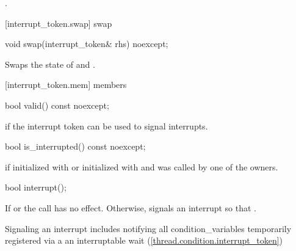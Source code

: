 {\begin{itemdescr}
  \pnum\returns {}.
\end{itemdescr}

[interrupt_token.swap]{ swap}

%
\begin{itemdecl}
void swap(interrupt_token& rhs) noexcept;
\end{itemdecl}

\begin{itemdescr}
\pnum
\effects Swaps the state of  and .
\end{itemdescr}


[interrupt_token.mem]{ members}

%
\begin{itemdecl}
bool valid() const noexcept;
\end{itemdecl}
\begin{itemdescr}
  \pnum\returns {} if the interrupt token can be used to signal interrupts.
\end{itemdescr}

%
\begin{itemdecl}
bool is_interrupted() const noexcept;
\end{itemdecl}
\begin{itemdescr}
  \pnum\returns {} if initialized with 
                or initialized with  and  was called
                by one of the owners.
\end{itemdescr}

%
\begin{itemdecl}
bool interrupt();
\end{itemdecl}
\begin{itemdescr}

  \pnum\effects If  or  the call has no effect. 
                Otherwise, signals an interrupt so that .
                \begin{note} Signaling an interrupt includes notifying all condition_variables
                             temporarily registered via a an interruptable wait (\ref{thread.condition.interrupt_token})
                             \end{note}



\end{itemdescr}}
